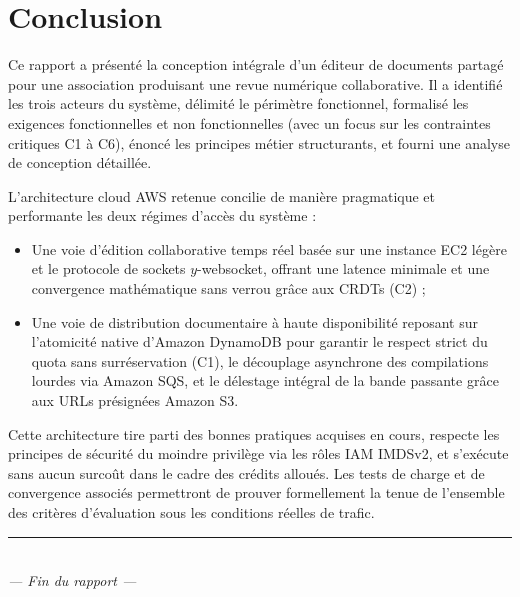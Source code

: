 \chapter*{Conclusion}

Ce rapport a présenté la conception intégrale d'un éditeur de documents partagé pour une association produisant une revue numérique collaborative. Il a identifié les trois acteurs du système, délimité le périmètre fonctionnel, formalisé les exigences fonctionnelles et non fonctionnelles (avec un focus sur les contraintes critiques C1 à C6), énoncé les principes métier structurants, et fourni une analyse de conception détaillée.

L'architecture cloud AWS retenue concilie de manière pragmatique et performante les deux régimes d'accès du système :
\begin{itemize}
    \item Une voie d'édition collaborative temps réel basée sur une instance EC2 légère et le protocole de sockets $y$-websocket, offrant une latence minimale et une convergence mathématique sans verrou grâce aux CRDTs (C2) ;
    \item Une voie de distribution documentaire à haute disponibilité reposant sur l'atomicité native d'Amazon DynamoDB pour garantir le respect strict du quota sans surréservation (C1), le découplage asynchrone des compilations lourdes via Amazon SQS, et le délestage intégral de la bande passante grâce aux URLs présignées Amazon S3.
\end{itemize}

Cette architecture tire parti des bonnes pratiques acquises en cours, respecte les principes de sécurité du moindre privilège via les rôles IAM IMDSv2, et s'exécute sans aucun surcoût dans le cadre des crédits alloués. Les tests de charge et de convergence associés permettront de prouver formellement la tenue de l'ensemble des critères d'évaluation sous les conditions réelles de trafic.

\vfill
\begin{center}
    {\color{violetprincipal}\rule{0.4\linewidth}{0.8pt}}\\[0.3cm]
    {\small\color{violetclair}\textit{--- Fin du rapport ---}}
\end{center}
